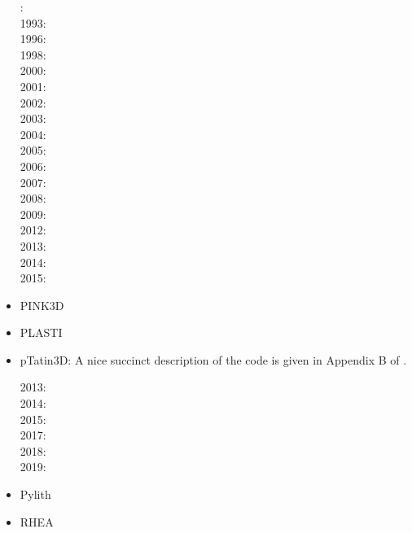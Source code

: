 \begin{itemize}
: \cite{cund89}\\
1993: \cite{poli93}\\
1996: \cite{hach96}\\
1998: \cite{gepd98}\\
2000: \cite{labp00}\\
2001: \cite{bujl01}\cite{bupo01}\\
2002: \cite{bast02}\cite{clbb02}\\
2003: \cite{hags03}\cite{gehd03}\cite{upke03}\\
2004: \cite{guhl04}\cite{gewi04}\cite{toba04}\cite{tibb04}\cite{clbm04}\\
2005: \cite{bugu05}\\
2006: \cite{buwa06}\\
2007: \cite{yaab07}\cite{buto07}\\
2008: \cite{yaba08}\cite{tibb08}\\
2009: \cite{gecm09}\cite{yahb09}\cite{bucl09}\\
2012: \cite{anwb12}\cite{gech12}\cite{gubc12}\cite{gerb12}\\
2013: \cite{wabd13}\cite{frbm13}\\
2014: \cite{frba14}\cite{gagb14}\cite{bufa14}\\
2015: \cite{wulc15}\cite{marl15}\cite{gebw15}\cite{svlh15}\\




\item PINK3D
\cite{vosc15}


\item PLASTI
\cite{fuwb06}



\item pTatin3D: A nice succinct description of the code is given in Appendix B of \cite{lemh17}.

2013: \cite{phil13}\\
2014: \cite{mabl14}\\
2015: \cite{mabl15}\\
2017: \cite{lemh17}\\
2018: \cite{jolp18}\\
2019: \cite{jolm19}

\item Pylith

\cite{aakw13}


\item RHEA
\cite{bugg08}
\cite{stgb10}
\cite{algs12}
\cite{busa13}


\end{itemize}
